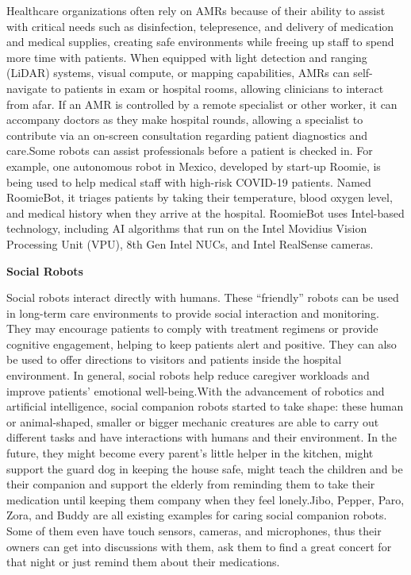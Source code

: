 \documentclass[12pt,a4paper]{report}
\begin{document}
Healthcare organizations often rely on AMRs because of their ability to assist with critical needs such as disinfection, telepresence, and delivery of medication and medical supplies, creating safe environments while freeing up staff to spend more time with patients. When equipped with light detection and ranging (LiDAR) systems, visual compute, or mapping capabilities, AMRs can self-navigate to patients in exam or hospital rooms, allowing clinicians to interact from afar. If an AMR is controlled by a remote specialist or other worker, it can accompany doctors as they make hospital rounds, allowing a specialist to contribute via an on-screen consultation regarding patient diagnostics and care.Some robots can assist professionals before a patient is checked in. For example, one autonomous robot in Mexico, developed by start-up Roomie, is being used to help medical staff with high-risk COVID-19 patients. Named RoomieBot, it triages patients by taking their temperature, blood oxygen level, and medical history when they arrive at the hospital. RoomieBot uses Intel-based technology, including AI algorithms that run on the Intel Movidius Vision Processing Unit (VPU), 8th Gen Intel NUCs, and Intel RealSense cameras.\par
 
\begin{center}
  \small{\textbf{Social Robots}}
\end{center}

Social robots interact directly with humans. These “friendly” robots can be used in long-term care environments to provide social interaction and monitoring. They may encourage patients to comply with treatment regimens or provide cognitive engagement, helping to keep patients alert and positive. They can also be used to offer directions to visitors and patients inside the hospital environment. In general, social robots help reduce caregiver workloads and improve patients’ emotional well-being.With the advancement of robotics and artificial intelligence, social companion robots started to take shape: these human or animal-shaped, smaller or bigger mechanic creatures are able to carry out different tasks and have interactions with humans and their environment. In the future, they might become every parent’s little helper in the kitchen, might support the guard dog in keeping the house safe, might teach the children and be their companion and support the elderly from reminding them to take their medication until keeping them company when they feel lonely.Jibo, Pepper, Paro, Zora, and Buddy are all existing examples for caring social companion robots. Some of them even have touch sensors, cameras, and microphones, thus their owners can get into discussions with them, ask them to find a great concert for that night or just remind them about their medications.\par
\end{document}
